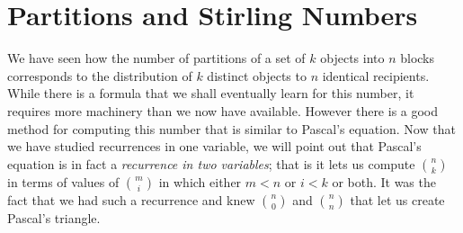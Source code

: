 \documentclass[10pt,]{book}
\theoremstyle{plain}
\theoremstyle{definition}
\theoremstyle{definition}
\numberwithin{equation}{chapter}
\newcommand{\lt}{<}
\begin{document}
\section[{Partitions and Stirling Numbers}]{Partitions and Stirling Numbers}\label{s3-2-partitions}
\hypertarget{p-794}{}%
We have seen how the number of partitions of a set of \(k\) objects into \(n\) blocks corresponds to the distribution of \(k\) distinct objects to \(n\) identical recipients. While there is a formula that we shall eventually learn for this number, it requires more machinery than we now have available. However there is a good method for computing this number that is similar to Pascal's equation. Now that we have studied recurrences in one variable, we will point out that Pascal's equation is in fact a \emph{recurrence in two variables}; that is it lets us compute \(\binom{n}{k}\) in terms of values of \(\binom{m}{i}\) in which either \(m\lt n\) or \(i\lt k\) or both. It was the fact that we had such a recurrence and knew \(\binom{n}{0}\) and \(\binom{n}{n}\) that let us create Pascal's triangle.%
\typeout{************************************************}
\typeout{************************************************}
\end{document}
